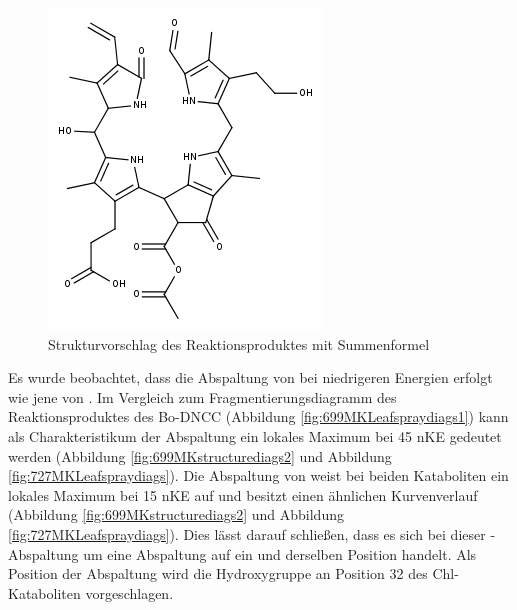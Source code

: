 \begin{figure}[!htbp]
  \centering
  \includegraphics[scale=0.6]{figures/Kapitel4/Kataboliten/fragmentation_structures/VWA_Katabolit_727.png}
  \caption[Strukturvorschlag des Reaktionsproduktes von Bo-NCC-3, Quelle: Autor]{Strukturvorschlag des Reaktionsproduktes mit Summenformel }
  \label{fig:727MKstructure}
\end{figure}

Es wurde beobachtet, dass die Abspaltung von  bei niedrigeren Energien erfolgt wie jene von . Im Vergleich zum Fragmentierungsdiagramm des Reaktionsproduktes des Bo-DNCC (Abbildung \ref{fig:699MKLeafspraydiags1}) kann als Charakteristikum der  Abspaltung ein lokales Maximum bei 45 \gls{nKE} gedeutet werden (Abbildung \ref{fig:699MKstructurediags2} und Abbildung \ref{fig:727MKLeafspraydiags}). Die Abspaltung von  weist bei beiden Kataboliten ein lokales Maximum bei 15 \gls{nKE} auf und besitzt einen ähnlichen Kurvenverlauf (Abbildung \ref{fig:699MKstructurediags2} und Abbildung \ref{fig:727MKLeafspraydiags}). Dies lässt darauf schließen, dass es sich bei dieser -Abspaltung um eine Abspaltung auf ein und derselben Position handelt. Als Position der Abspaltung wird die Hydroxygruppe an Position 32 des Chl-Kataboliten vorgeschlagen. 

